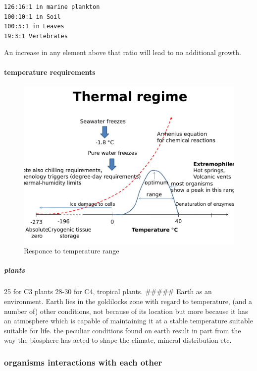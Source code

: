 \documentclass[]{article}
\let\oldparagraph\paragraph
\renewcommand{\paragraph}[1]{\oldparagraph{#1}\mbox{}}
\let\oldsubparagraph\subparagraph
\renewcommand{\subparagraph}[1]{\oldsubparagraph{#1}\mbox{}}
\begin{document}
\begin{verbatim}
126:16:1 in marine plankton
100:10:1 in Soil
100:5:1 in Leaves
19:3:1 Vertebrates
\end{verbatim}

An increase in any element above that ratio will lead to no additional
growth.

\hypertarget{temperature-requirements}{%
\paragraph{temperature requirements}\label{temperature-requirements}}

\begin{figure}
\centering
\includegraphics{Images/ThermalStimulus.jpg}
\caption{Responce to temperature range}
\end{figure}

\hypertarget{plants-2}{%
\subparagraph{plants}\label{plants-2}}

25 for C3 plants 28-30 for C4, tropical plants. \#\#\#\#\# Earth as an
environment. Earth lies in the goldilocks zone with regard to
temperature, (and a number of) other conditions, not because of its
location but more because it has an atmosphere which is capable of
maintaining it at a stable temperature suitable suitable for life. the
peculiar conditions found on earth result in part from the way the
biosphere has acted to shape the climate, mineral distribution etc.

\hypertarget{organisms-interactions-with-each-other}{%
\subsubsection{organisms interactions with each
other}\label{organisms-interactions-with-each-other}}
\end{document}
